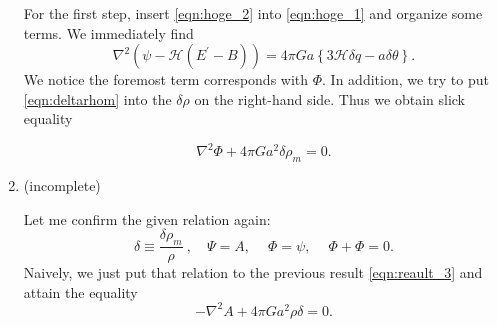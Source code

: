 \documentclass[a4paper,pdftex,10pt]{article}
\begin{document}
\begin{enumerate}
        For the first step, insert \eqref{eqn:hoge_2} into \eqref{eqn:hoge_1} and organize some terms. We immediately find
        \begin{equation}
          \nabla^2(\psi-\mathcal{H}(E^{\prime}-B))
          =
          4\pi Ga
          \left\{
          3\mathcal{H}\delta q
          -
          a\delta \theta
          \right\}
          .
        \end{equation}
        We notice the foremost term corresponds with $\Phi$. In addition, we try to put \eqref{eqn:deltarhom} into the $\delta\rho$ on the right-hand side. Thus we obtain slick equality
        \begin{graybox}
          \vspace*{-5pt}
          \begin{equation}
            \nabla^2\Phi
            +
            4\pi Ga^2\delta\rho_{m}
            =
            0
            .
            \label{eqn:reault_3}
          \end{equation}
        \end{graybox}

  \item
        (incomplete)
        
        Let me confirm the given relation again:
        \begin{equation}
          \delta
          \equiv
          \frac{\delta\rho_{m}}{\rho}
          \ ,\quad
          \Psi=A
          ,\ \quad
          \Phi=\psi
          ,\ \quad
          \Phi+\Phi=0
          .
        \end{equation}
        Naively, we just put that relation to the previous result \eqref{eqn:reault_3} and attain the equality
        \begin{equation}
          -\nabla^2 A+4\pi Ga^2 \rho\delta=0
          .
          \label{eqn:hoge_3}
        \end{equation}

\end{enumerate}
\end{document}
